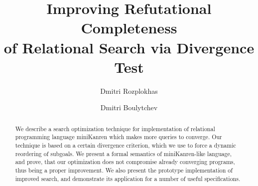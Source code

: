 \documentclass{llncs}
\begin{document}
\sloppy
\mainmatter

\title{Improving Refutational Completeness\\
of Relational Search via Divergence Test}

\author{
  Dmitri Rozplokhas \and Dmitri Boulytchev
}


\maketitle

\begin{abstract}
We describe a search optimization technique for implementation of relational programming language
miniKanren which makes more queries to converge. Our technique is based on a certain 
divergence criterion, which we use to force a dynamic reordering of subgoals. We present a formal semantics of
miniKanren-like language, and prove, that our optimization does not compromise already
converging programs, thus being a proper improvement. We also present the prototype
implementation of improved search, and demonstrate its application for a number of
useful specifications.
\end{abstract}







\end{document}
